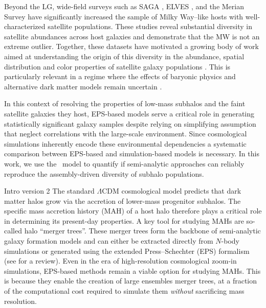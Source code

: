 Beyond the LG, wide-field surveys such as SAGA \citep{Mao.etal.24}, ELVES \citep{Carlsten.etal.22}, and the Merian Survey \citep{Pan.etal.26} have significantly increased the sample of Milky Way–like hosts with well-characterized satellite populations. These studies reveal substantial diversity in satellite abundances across host galaxies and demonstrate that the MW is not an extreme outlier. Together, these datasets have motivated a growing body of work aimed at understanding the origin of this diversity in the abundance, spatial distribution and color properties of satellite galaxy populations \citep[e.g.][]{Wang.etal.21, Danieli.etal.23, Kado-Fong.etal.25}. This is particularly relevant in a regime where the effects of baryonic physics \citep{Garrison-Kimmel.etal.14, Wetzel.etal.16, Garrison-Kimmel.etal.17} and alternative dark matter models \citep{Nadler.etal.25} remain uncertain \citep{Sales.etal.22}.

In this context of resolving the properties of low-mass subhalos and the faint satellite galaxies they host, EPS-based models serve a critical role in generating statistically significant galaxy samples \citep{Jiang.etal.21, Green.etal.21, Folsom.etal.2023, Monzon.etal.24, Dropulic.etal.25, Monzon.etal.26} despite relying on simplifying assumption that neglect correlations with the large-scale environment. Since cosmological simulations inherently encode these environmental dependencies a systematic comparison between EPS-based and simulation-based models is necessary. In this work, we use the \SatGen\ model \citep{Jiang.etal.21, Green.etal.21} to quantify if semi-analytic approaches can reliably reproduce the assembly-driven diversity of subhalo populations.


Intro version 2
The standard $\Lambda$CDM cosmological model predicts that dark matter halos grow via the accretion of lower-mass progenitor subhalos. The specific mass accretion history (MAH) of a host halo therefore plays a critical role in determining its present-day properties. A key tool for studying MAHs are so-called halo ``merger trees''. These merger trees form the backbone of semi-analytic galaxy formation models \citep{White.Frenk.91, Somerville.Primack.99, Taylor.Babul.01, Zentner.etal.05} and can either be extracted directly from $N$-body simulations or generated using the extended Press–Schechter (EPS) formalism (see \citealt{Zentner.07} for a review). Even in the era of high-resolution cosmological zoom-in simulations, EPS-based methods remain a viable option for studying MAHs. This is because they enable the creation of large ensembles merger trees, at a fraction of the computational cost required to simulate them \textit{without} sacrificing mass resolution. 

